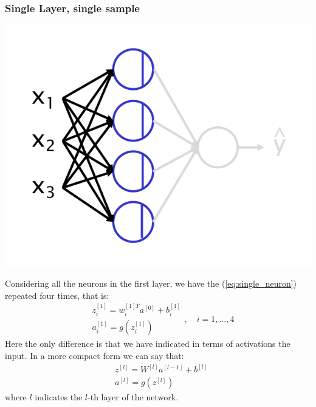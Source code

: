 \subsubsection{Single Layer, single sample}
\begin{multicols}{2}
    \begin{center}
        \includegraphics[scale=0.45]{img/2L_layer.png}
        \vspace{-0.5cm}
    \end{center}
    Considering all the neurons in the first layer, we have the (\ref{eq:single_neuron}) repeated four times, that is: 
    \begin{equation*}
        \begin{aligned}
            &z_i^{[1]}=w_i^{[1]T}{a^{[0]}}+b_i^{[1]}\\
            &a_i^{[1]}=g(z_i^{[1]})
        \end{aligned}, \quad i=1,...,4
    \end{equation*}
    Here the only difference is that we have indicated in terms of activations the input. In a more compact form we can say that:
    \begin{equation}
        \begin{aligned}
            &z^{[l]}=W^{[l]}a^{[l-1]}+b^{[l]}\\
            &a^{[l]}=g(z^{[l]})
        \end{aligned}
    \end{equation}
    where $l$ indicates the $l$-th layer of the network.
 \end{multicols}

